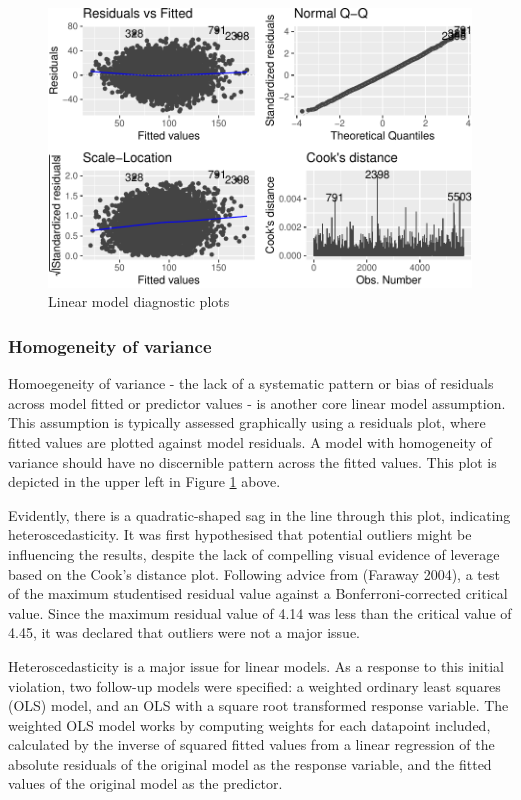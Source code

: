 \documentclass{article}
\begin{document}
\begin{figure}
\centering
\includegraphics{OLET5608_TrentHenderson_files/figure-latex/diagnostics-1.pdf}
\caption{\label{fig:diagnostics}Linear model diagnostic plots}
\end{figure}

\hypertarget{homogeneity-of-variance}{%
\subsubsection{Homogeneity of variance}\label{homogeneity-of-variance}}

Homoegeneity of variance - the lack of a systematic pattern or bias of residuals across model fitted or predictor values - is another core linear model assumption. This assumption is typically assessed graphically using a residuals plot, where fitted values are plotted against model residuals. A model with homogeneity of variance should have no discernible pattern across the fitted values. This plot is depicted in the upper left in Figure \ref{fig:diagnostics} above.

Evidently, there is a quadratic-shaped sag in the line through this plot, indicating heteroscedasticity. It was first hypothesised that potential outliers might be influencing the results, despite the lack of compelling visual evidence of leverage based on the Cook's distance plot. Following advice from (Faraway 2004), a test of the maximum studentised residual value against a Bonferroni-corrected critical value. Since the maximum residual value of 4.14 was less than the critical value of 4.45, it was declared that outliers were not a major issue.

Heteroscedasticity is a major issue for linear models. As a response to this initial violation, two follow-up models were specified: a weighted ordinary least squares (OLS) model, and an OLS with a square root transformed response variable. The weighted OLS model works by computing weights for each datapoint included, calculated by the inverse of squared fitted values from a linear regression of the absolute residuals of the original model as the response variable, and the fitted values of the original model as the predictor.
\end{document}
